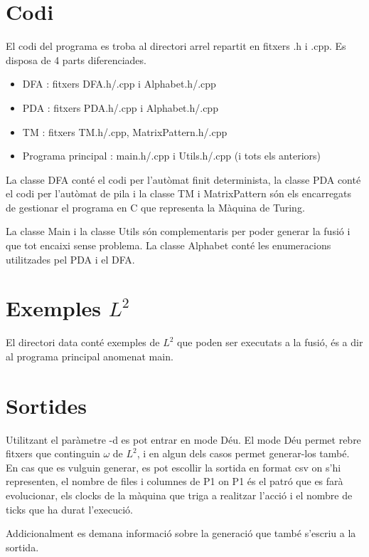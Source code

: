 \documentclass[12pt,a4paper]{report}
\def \w{$\omega$}
\def \ld{$L^{2}$}
\begin{document}
\section{Codi}

El codi del programa es troba al directori arrel repartit en fitxers .h i .cpp. Es disposa de 4 parts diferenciades.

\begin{itemize}
\item DFA : fitxers DFA.h/.cpp i Alphabet.h/.cpp
\item PDA : fitxers PDA.h/.cpp i Alphabet.h/.cpp
\item TM : fitxers TM.h/.cpp, MatrixPattern.h/.cpp
\item Programa principal : main.h/.cpp i Utils.h/.cpp (i tots els anteriors)
\end{itemize}

La classe DFA conté el codi per l'autòmat finit determinista, la classe PDA conté el codi per l'autòmat de pila i la classe TM i MatrixPattern són els encarregats de gestionar el programa en C que representa la Màquina de Turing.

La classe Main i la classe Utils són complementaris per poder generar la fusió i que tot encaixi sense problema. La classe Alphabet conté les enumeracions utilitzades pel PDA i el DFA.

\section{Exemples $L^2$}

El directori data conté exemples de $L^2$ que poden ser executats a la fusió, és a dir al programa principal anomenat main.

\section{Sortides}

Utilitzant el paràmetre -d es pot entrar en mode Déu. El mode Déu permet rebre fitxers que continguin \w{} de \ld{}, i en algun dels casos permet generar-los també. En cas que es vulguin generar, es pot escollir la sortida en format csv on s'hi representen, el nombre de files i columnes de P1 on P1 és el patró que es farà evolucionar, els clocks de la màquina que triga a realitzar l'acció i el nombre de ticks que ha durat l'execució.

Addicionalment es demana informació sobre la generació que també s'escriu a la sortida.
\end{document}
